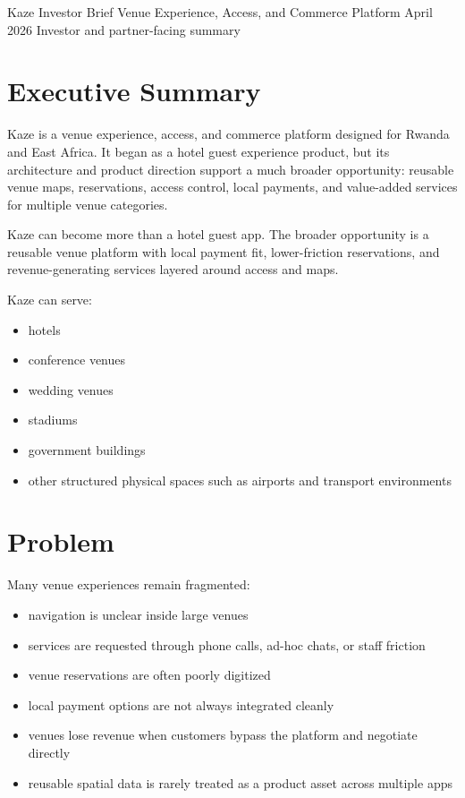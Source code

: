 \documentclass[11pt,a4paper]{article}
\begin{document}
\KazeCover
  {Kaze Investor Brief}
  {Venue Experience, Access, and Commerce Platform}
  {April 2026}
  {Investor and partner-facing summary}

\KazeDocumentNotice

\section{Executive Summary}

Kaze is a venue experience, access, and commerce platform designed for Rwanda and East Africa. It began as a hotel guest experience product, but its architecture and product direction support a much broader opportunity: reusable venue maps, reservations, access control, local payments, and value-added services for multiple venue categories.

\begin{kazecalloutbox}
Kaze can become more than a hotel guest app. The broader opportunity is a reusable venue platform with local payment fit, lower-friction reservations, and revenue-generating services layered around access and maps.
\end{kazecalloutbox}

Kaze can serve:
\begin{itemize}
    \item hotels
    \item conference venues
    \item wedding venues
    \item stadiums
    \item government buildings
    \item other structured physical spaces such as airports and transport environments
\end{itemize}

\section{Problem}

Many venue experiences remain fragmented:
\begin{itemize}
    \item navigation is unclear inside large venues
    \item services are requested through phone calls, ad-hoc chats, or staff friction
    \item venue reservations are often poorly digitized
    \item local payment options are not always integrated cleanly
    \item venues lose revenue when customers bypass the platform and negotiate directly
    \item reusable spatial data is rarely treated as a product asset across multiple apps
\end{itemize}
\end{document}
